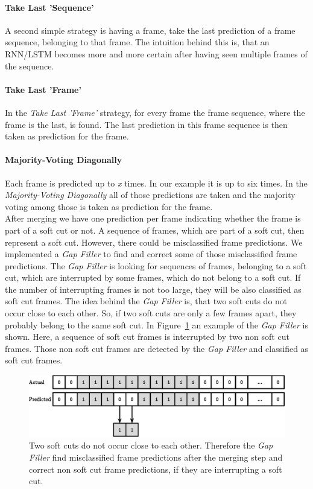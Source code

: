 \paragraph{Take Last 'Sequence'}
A second simple strategy is having a frame, take the last prediction of a frame sequence, belonging to that frame.
The intuition behind this is, that an RNN/LSTM becomes more and more certain after having seen multiple frames of the sequence.

\paragraph{Take Last 'Frame'}
In the \textit{Take Last 'Frame'} strategy, for every frame the frame sequence, where the frame is the last, is  found. The last prediction in this frame sequence is then taken as prediction for the frame.

\paragraph{Majority-Voting Diagonally}
Each frame is predicted up to \textit{x} times.
In our example it is up to six times.
In the \textit{Majority-Voting Diagonally} all of those predictions are taken and the majority voting among those is taken as prediction for the frame. \\

After merging we have one prediction per frame indicating whether the frame is part of a soft cut or not.
A sequence of frames, which are part of a soft cut, then represent a soft cut.
However, there could be misclassified frame predictions.
We implemented a \textit{Gap Filler} to find and correct some of those misclassified frame predictions.
The \textit{Gap Filler} is looking for sequences of frames, belonging to a soft cut, which are interrupted by some frames, which do not belong to a soft cut.
If the number of interrupting frames is not too large, they will be also classified as soft cut frames.
The idea behind the \textit{Gap Filler} is, that two soft cuts do not occur close to each other.
So, if two soft cuts are only a few frames apart, they probably belong to the same soft cut.
In Figure~\ref{fig:gap_filler} an example of the \textit{Gap Filler} is shown.
Here, a sequence of soft cut frames is interrupted by two non soft cut frames.
Those non soft cut frames are detected by the \textit{Gap Filler} and classified as soft cut frames.
\begin{figure}[!htb]
	\centering
	\includegraphics[scale=.7]{images/gap_filler.eps}
	\caption{Two soft cuts do not occur close to each other. Therefore the \textit{Gap Filler} find misclassified frame predictions after the merging step and correct non soft cut frame predictions, if they are interrupting a soft cut.}
	\label{fig:gap_filler}
\end{figure}

